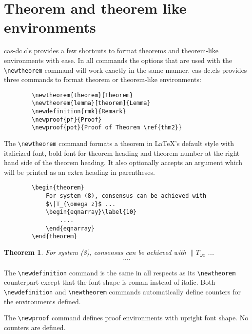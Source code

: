 \documentclass[a4paper,fleqn]{cas-dc}
\begin{document}
	\section[Theorem and ...]{Theorem and theorem like environments}
	
	{cas-dc.cls} provides a few shortcuts to format theorems and
	theorem-like environments with ease. In all commands the options that
	are used with the \verb+\newtheorem+ command will work exactly in the same
	manner. {cas-dc.cls} provides three commands to format theorem or
	theorem-like environments: 
	
	\begin{verbatim}
		\newtheorem{theorem}{Theorem}
		\newtheorem{lemma}[theorem]{Lemma}
		\newdefinition{rmk}{Remark}
		\newproof{pf}{Proof}
		\newproof{pot}{Proof of Theorem \ref{thm2}}
	\end{verbatim}
	
	
	The \verb+\newtheorem+ command formats a
	theorem in \LaTeX's default style with italicized font, bold font
	for theorem heading and theorem number at the right hand side of the
	theorem heading.  It also optionally accepts an argument which
	will be printed as an extra heading in parentheses. 
	
	\begin{verbatim}
		\begin{theorem} 
			For system (8), consensus can be achieved with 
			$\|T_{\omega z}$ ...
			\begin{eqnarray}\label{10}
				....
			\end{eqnarray}
		\end{theorem}
	\end{verbatim}  
	
	
	\newtheorem{theorem}{Theorem}
	
	\begin{theorem}
		For system (8), consensus can be achieved with 
		$\|T_{\omega z}$ ...
		\begin{eqnarray}\label{10}
			....
		\end{eqnarray}
	\end{theorem}
	
	The \verb+\newdefinition+ command is the same in
	all respects as its \verb+\newtheorem+ counterpart except that
	the font shape is roman instead of italic.  Both
	\verb+\newdefinition+ and \verb+\newtheorem+ commands
	automatically define counters for the environments defined.
	
	The \verb+\newproof+ command defines proof environments with
	upright font shape.  No counters are defined. 
	
\end{document}
